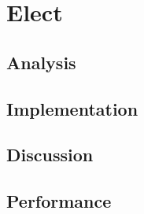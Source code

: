 \section{Elect}
\subsection{Analysis} %
\subsection{Implementation} %
\subsection{Discussion} %
\subsection{Performance} %

